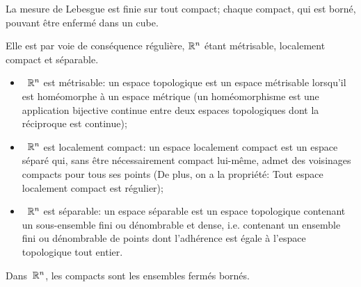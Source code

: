 \begin{theoreme}
La mesure de Lebesgue est finie sur tout compact; chaque compact, qui est borné,
pouvant être enfermé dans un cube.
\end{theoreme}

Elle est par voie de conséquence régulière, $\mathbb R^n$ étant métrisable, localement compact et séparable.
\begin{itemize}
  \item~$\mathbb R^n$ est métrisable: un espace topologique est un espace métrisable lorsqu'il est
	homéomorphe à un espace métrique (un homéomorphisme est une application bijective
	continue entre deux espaces topologiques dont la réciproque est continue);
  \item~$\mathbb R^n$ est localement compact: un espace localement compact est un espace séparé qui,
	sans être nécessairement compact lui-même, admet des voisinages compacts pour tous
	ses points (De plus, on a la propriété: Tout espace localement compact est régulier);
  \item~$\mathbb R^n$ est séparable: un espace séparable est un espace topologique contenant un
	sous-ensemble fini ou dénombrable et dense, i.e. contenant un ensemble fini ou dénombrable
	de points dont l'adhérence est égale à l'espace topologique tout entier.
\end{itemize}

\begin{theoreme}
Dans~$\mathbb R^n$, les compacts sont les ensembles fermés bornés.
\end{theoreme}

